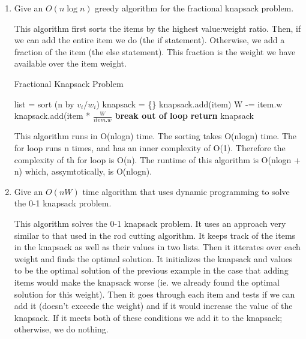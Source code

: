 \documentclass{article}
\begin{document}
\begin{enumerate}
    \item Give an $O(n\log n)$ greedy algorithm for the fractional knapsack problem.
      
This algorithm first sorts the items by the highest value:weight ratio. Then, if we can add the entire item we do (the if statement). Otherwise, we add a fraction of the item (the else statement). This fraction is the weight we have available over the item weight. 

\begin{algorithm}
    \caption{Fractional Knapsack Problem}\label{fracKnap}
    \begin{algorithmic}[1]
      \State list = sort (n by $v_i/w_i$)
      \State knapsack = \{\}
      		\State knapsack.add(item)
      		\State W -= item.w
      	\Else
      		\State knapsack.add(item * $\frac{W}{item.w}$
      		\State \textbf{break out of loop}
      	\EndIf
      \EndFor
      \State \textbf{return} knapsack
    \EndFunction
    \end{algorithmic}
\end{algorithm} 

This algorithm runs in O(nlogn) time. The sorting takes O(nlogn) time. The for loop runs n times, and has an inner complexity of O(1). Therefore the complexity of th for loop is O(n). The runtime of this algorithm is O(nlogn + n) which, assymtotically, is O(nlogn).
    
    \item Give an $O(nW)$ time algorithm that uses dynamic programming to solve
        the 0-1 knapsack problem.
        
This algorithm solves the 0-1 knapsack problem. It uses an approach very similar to that used in the rod cutting algorithm. It keeps track of the items in the knapsack as well as their values in two lists. Then it itterates over each weight and finds the optimal solution. It initializes the knapsack and values to be the optimal solution of the previous example in the case that adding items would make the knapsack worse (ie. we already found the optimal solution for this weight). Then it goes through each item and tests if we can add it (doesn't exceede the weight) and if it would increase the value of the knapsack. If it meets both of these conditions we add it to the knapsack; otherwise, we do nothing.

        

\end{enumerate}
\end{document}
